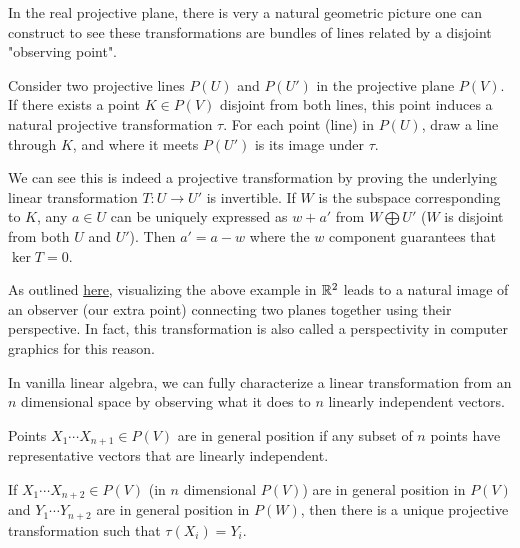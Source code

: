 \documentclass[10pt]{article}
\begin{document}
In the real projective plane, there is very a natural geometric picture one can
construct to see these transformations are bundles of lines related by a
disjoint "observing point".

\begin{example}
Consider two projective lines $P(U)$ and $P(U')$ in the projective plane
$P(V)$. If there exists a point $K \in P(V)$ disjoint from both lines, this
point induces a natural projective transformation $\tau$. For each point (line) in
$P(U)$, draw a line through $K$, and where it meets $P(U')$ is its image under
$\tau$.

We can see this is indeed a projective transformation by proving the underlying
linear transformation $T: U \to U'$ is invertible. If $W$ is the subspace
corresponding to $K$, any $a \in U$ can be uniquely expressed as $w +
a'$ from $W \bigoplus U'$ ($W$ is disjoint from both $U$ and $U'$). Then $a' =
a - w$ where the $w$ component guarantees that $\ker T = 0$.

\end{example}

\begin{note}
	As outlined \href{https://en.wikipedia.org/wiki/Homography#Geometric_motivation}{here},
visualizing the above example in $\mathbb{R}^2$ leads to a natural image of an observer
(our extra point) connecting two planes together using their perspective. In
fact, this transformation is also called a perspectivity in computer graphics for this
reason.
\end{note}

In vanilla linear algebra, we can fully characterize a linear transformation from an
$n$ dimensional space by observing what it does to $n$ linearly independent
vectors. 

\begin{definition}
	 Points $X_1 \cdots X_{n+1} \in P(V)$ are in general position if any subset
	 of $n$ points have representative vectors that are linearly independent.
\end{definition}

\begin{theorem}
	 If $X_1 \cdots X_{n+2} \in P(V)$ (in $n$ dimensional $P(V)$) are in general
	 position in $P(V)$ and $Y_1 \cdots Y_{n+2}$ are in general position in
	 $P(W)$, then there is a unique projective transformation such that
	 $\tau(X_i) = Y_i$.
\end{theorem}
\end{document}
